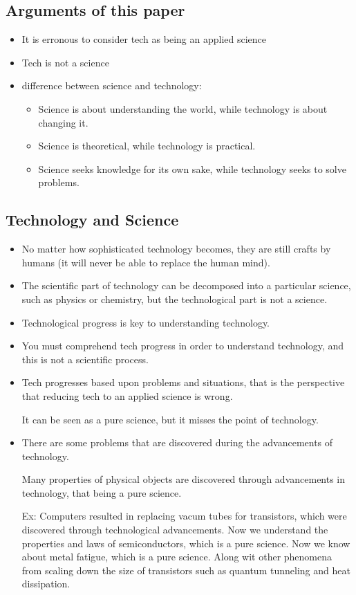 \documentclass{article}
\begin{document}
\subsection{Arguments of this paper}
\begin{itemize}
  \item It is erronous to consider tech as being an applied science
  \item Tech is not a science
  \item difference between science and technology:
    \begin{itemize}
      \item Science is about understanding the world, while technology is about changing it.
      \item Science is theoretical, while technology is practical.
      \item Science seeks knowledge for its own sake, while technology seeks to solve problems.
    \end{itemize}
\end{itemize}

\subsection{Technology and Science}
\begin{itemize}
  \item No matter how sophisticated technology becomes, they are still crafts by humans
    (it will never be able to replace the human mind).
  \item The scientific part of technology can be decomposed into a particular science,
    such as physics or chemistry, but the technological part is not a science.
  \item Technological progress is key to understanding technology.
  \item You must comprehend tech progress in order to understand technology,
    and this is not a scientific process.
  \item Tech progresses based upon problems and situations, that is
    the perspective that reducing tech to an applied science is wrong.

    It can be seen as a pure science, but it misses the point of technology.
  \item There are some problems that are discovered during the advancements of technology.

    Many properties of physical objects are discovered through advancements in technology, that being a pure science.

    Ex: Computers resulted in replacing vacum tubes for transistors, which were discovered through technological advancements.
    Now we understand the properties and laws of semiconductors, which is a pure science.
    Now we know about metal fatigue, which is a pure science. Along wit other phenomena from
    scaling down the size of transistors such as quantum tunneling and heat dissipation.
\end{itemize}
\end{document}
